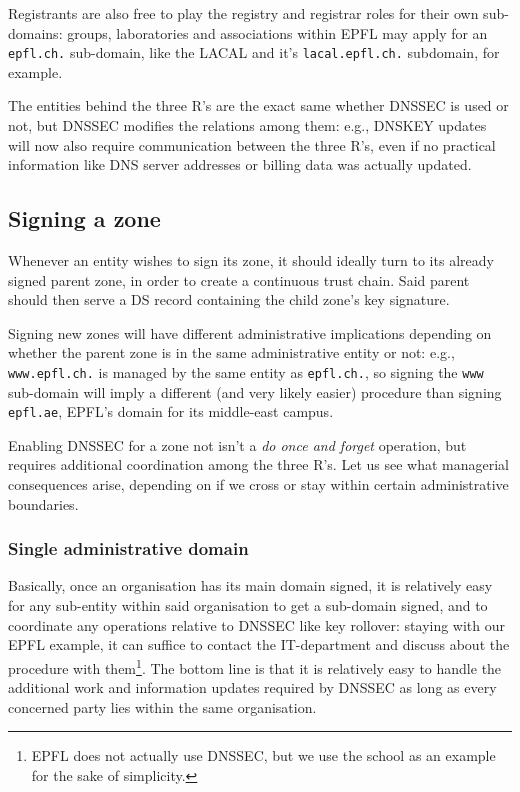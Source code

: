 \documentclass[a4paper,twocolumn]{scrartcl}
\begin{document}
Registrants are also free to play the registry and registrar roles for their own sub-domains: groups, laboratories and associations within EPFL may apply for an \verb|epfl.ch.| sub-domain, like the LACAL and it's \verb|lacal.epfl.ch.| subdomain, for example.

The entities behind the three R's are the exact same whether DNSSEC is used or not, but DNSSEC modifies the relations among them: e.g., DNSKEY updates will now also require communication between the three R's, even if no practical information like DNS server addresses or billing data was actually updated.

\subsection{Signing a zone}
Whenever an entity wishes to sign its zone, it should ideally turn to its already signed parent zone, in order to create a continuous trust chain.
Said parent should then serve a DS record containing the child zone's key signature.

Signing new zones will have different administrative implications depending on whether the parent zone is in the same administrative entity or not: e.g., \verb|www.epfl.ch.| is managed by the same entity as \verb|epfl.ch.|, so signing the \verb|www| sub-domain will imply a different (and very likely easier) procedure than signing \verb|epfl.ae|, EPFL's domain for its middle-east campus.

Enabling DNSSEC for a zone not isn't a \emph{do once and forget} operation, but requires additional coordination among the three R's. Let us see what managerial consequences arise, depending on if we cross or stay within certain administrative boundaries.

\subsubsection{Single administrative domain}
Basically, once an organisation has its main domain signed, it is relatively easy for any sub-entity within said organisation to get a sub-domain signed, and to coordinate any operations relative to DNSSEC like key rollover: staying with our EPFL example, it can suffice to contact the IT-department and discuss about the procedure with them\footnote{EPFL does not actually use DNSSEC, but we use the school as an example for the sake of simplicity.}. The bottom line is that it is relatively easy to handle the additional work and information updates required by DNSSEC as long as every concerned party lies within the same organisation.
\end{document}
